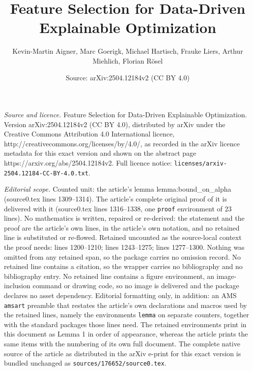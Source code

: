 \documentclass[10pt,a4paper]{amsart}
\title{Feature Selection for Data-Driven Explainable Optimization}
\author{Kevin-Martin Aigner, Marc Goerigk, Michael Hartisch, Frauke Liers, Arthur Miehlich, Florian R\"osel}
\date{Source: arXiv:2504.12184v2 (CC BY 4.0)}
\begin{document}
\maketitle

\noindent\emph{Source and licence.} Feature Selection for Data-Driven Explainable Optimization. Version arXiv:2504.12184v2 (CC BY 4.0), distributed by arXiv under the Creative Commons Attribution 4.0 International licence, http://creativecommons.org/licenses/by/4.0/, as recorded in the arXiv licence metadata for this exact version and shown on the abstract page https://arxiv.org/abs/2504.12184v2. Full licence notice: \texttt{licenses/arxiv-2504.12184-CC-BY-4.0.txt}.\par\smallskip

\noindent\textit{Editorial scope.} Counted unit: the article's lemma lemma:bound\_on\_alpha (source0.tex lines 1309--1314). The article's complete original proof of it is delivered with it (source0.tex lines 1316--1338, one \texttt{proof} environment of 23 lines). No mathematics is written, repaired or re-derived: the statement and the proof are the article's own lines, in the article's own notation, and no retained line is substituted or re-flowed.  Retained uncounted as the source-local context the proof needs: lines 1200--1210; lines 1243--1275; lines 1277--1300.  Nothing was omitted from any retained span, so the package carries no omission record.  No retained line contains a citation, so the wrapper carries no bibliography and no bibliography entry.  No retained line contains a figure environment, an image-inclusion command or drawing code, so no image is delivered and the package declares no asset dependency.  Editorial formatting only, in addition: an AMS \texttt{amsart} preamble that restates the article's own declarations and macros used by the retained lines, namely the environments \texttt{lemma} on separate counters, together with the standard packages those lines need.  The retained environments print in this document as Lemma 1 in order of appearance, whereas the article prints the same items with the numbering of its own full document.  The complete native source of the article as distributed in the arXiv e-print for this exact version is bundled unchanged as \texttt{sources/176652/source0.tex}.
\end{document}
